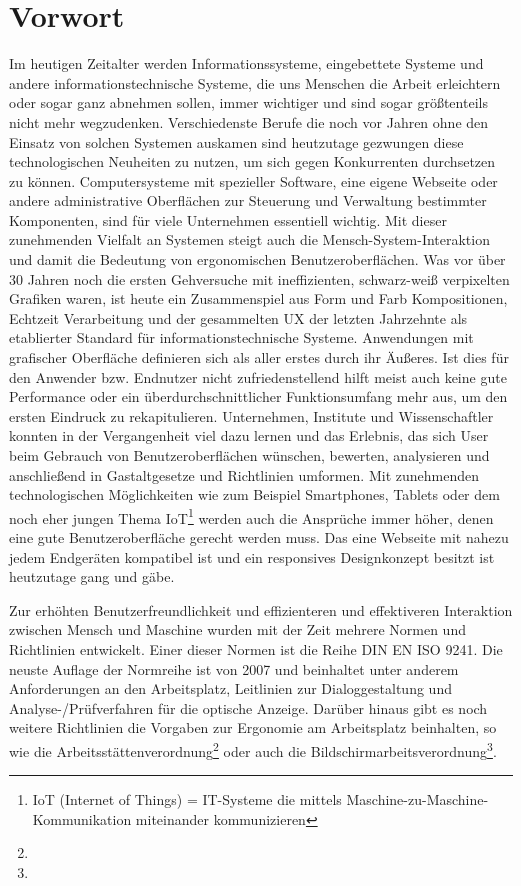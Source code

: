 \section{Vorwort}

Im heutigen Zeitalter werden Informationssysteme, eingebettete Systeme und andere informationstechnische Systeme, die uns Menschen die Arbeit erleichtern oder sogar ganz abnehmen sollen, immer wichtiger und sind sogar größtenteils nicht mehr wegzudenken. Verschiedenste Berufe die noch vor Jahren ohne den Einsatz von solchen Systemen auskamen sind heutzutage gezwungen diese technologischen Neuheiten zu nutzen, um sich gegen Konkurrenten durchsetzen zu können. Computersysteme mit spezieller Software, eine eigene Webseite oder andere administrative Oberflächen zur Steuerung und Verwaltung bestimmter Komponenten, sind für viele Unternehmen essentiell wichtig. Mit dieser zunehmenden Vielfalt an Systemen steigt auch die Mensch-System-Interaktion und damit die Bedeutung von ergonomischen Benutzeroberflächen. Was vor über 30 Jahren noch die ersten Gehversuche mit ineffizienten, schwarz-weiß verpixelten Grafiken waren, ist heute ein Zusammenspiel aus Form und Farb Kompositionen, Echtzeit Verarbeitung und der gesammelten UX der letzten Jahrzehnte als etablierter Standard für informationstechnische Systeme. Anwendungen mit grafischer Oberfläche definieren sich als aller erstes durch ihr Äußeres. Ist dies für den Anwender bzw. Endnutzer nicht zufriedenstellend hilft meist auch keine gute Performance oder ein überdurchschnittlicher Funktionsumfang mehr aus, um den ersten Eindruck zu rekapitulieren. Unternehmen, Institute und Wissenschaftler konnten in der Vergangenheit viel dazu lernen und das Erlebnis, das sich User beim Gebrauch von Benutzeroberflächen wünschen, bewerten, analysieren und anschließend in Gastaltgesetze und Richtlinien umformen. Mit zunehmenden technologischen Möglichkeiten wie zum Beispiel Smartphones, Tablets oder dem noch eher jungen Thema IoT\footnote{IoT (Internet of Things) = IT-Systeme die mittels Maschine-zu-Maschine-Kommunikation miteinander kommunizieren} werden auch die Ansprüche immer höher, denen eine gute Benutzeroberfläche gerecht werden muss. Das eine Webseite mit nahezu jedem Endgeräten kompatibel ist und ein responsives Designkonzept besitzt ist heutzutage gang und gäbe.

Zur erhöhten Benutzerfreundlichkeit und effizienteren und effektiveren Interaktion zwischen Mensch und Maschine wurden mit der Zeit mehrere Normen und Richtlinien entwickelt. Einer dieser Normen ist die Reihe DIN EN ISO 9241. Die neuste Auflage der Normreihe ist von 2007 und beinhaltet unter anderem Anforderungen an den Arbeitsplatz, Leitlinien zur Dialoggestaltung und Analyse-/Prüfverfahren für die optische Anzeige. Darüber hinaus gibt es noch weitere Richtlinien die Vorgaben zur Ergonomie am Arbeitsplatz beinhalten, so wie die Arbeitsstättenverordnung\footnote{} oder auch die Bildschirmarbeitsverordnung\footnote{}.

